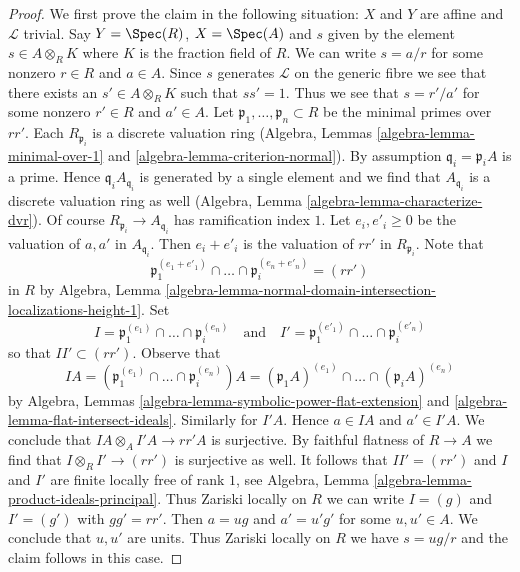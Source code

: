\begin{proof}
\medskip\noindent
We first prove the claim in the following situation:
$X$ and $Y$ are affine and $\mathcal{L}$ trivial. Say $Y = \Spec(R)$,
$X = \Spec(A)$ and $s$ given by the element $s \in A \otimes_R K$
where $K$ is the fraction field of $R$. We can write $s = a/r$
for some nonzero $r \in R$ and $a \in A$. Since $s$ generates $\mathcal{L}$
on the generic fibre we see that there exists an $s' \in A \otimes_R K$
such that $ss' = 1$. Thus we see that $s = r'/a'$ for some
nonzero $r' \in R$ and $a' \in A$. Let
$\mathfrak p_1, \ldots, \mathfrak p_n \subset R$
be the minimal primes over $rr'$. Each $R_{\mathfrak p_i}$
is a discrete valuation ring
(Algebra, Lemmas \ref{algebra-lemma-minimal-over-1} and
\ref{algebra-lemma-criterion-normal}). By assumption
$\mathfrak q_i = \mathfrak p_i A$ is a prime. Hence
$\mathfrak q_i A_{\mathfrak q_i}$ is generated by a single element
and we find that $A_{\mathfrak q_i}$ is a discrete valuation ring as
well (Algebra, Lemma \ref{algebra-lemma-characterize-dvr}). Of course
$R_{\mathfrak p_i} \to A_{\mathfrak q_i}$ has ramification index $1$.
Let $e_i, e'_i \geq 0$ be the  valuation of $a, a'$ in $A_{\mathfrak q_i}$.
Then $e_i + e'_i$ is the valuation of $rr'$ in $R_{\mathfrak p_i}$. Note that
$$
\mathfrak p_1^{(e_1 + e'_1)} \cap \ldots \cap \mathfrak p_i^{(e_n + e'_n)} =
(rr')
$$
in $R$ by Algebra, Lemma
\ref{algebra-lemma-normal-domain-intersection-localizations-height-1}.
Set
$$
I = \mathfrak p_1^{(e_1)} \cap \ldots \cap \mathfrak p_i^{(e_n)}
\quad\text{and}\quad
I' = \mathfrak p_1^{(e'_1)} \cap \ldots \cap \mathfrak p_i^{(e'_n)}
$$
so that $II' \subset (rr')$. Observe that
$$
IA =
(\mathfrak p_1^{(e_1)} \cap \ldots \cap \mathfrak p_i^{(e_n)})A =
(\mathfrak p_1A)^{(e_1)} \cap \ldots \cap (\mathfrak p_i A)^{(e_n)}
$$
by Algebra, Lemmas \ref{algebra-lemma-symbolic-power-flat-extension} and
\ref{algebra-lemma-flat-intersect-ideals}. Similarly for $I'A$. Hence
$a \in IA$ and $a' \in I'A$.
We conclude that $IA \otimes_A I'A \to rr'A$ is surjective.
By faithful flatness of $R \to A$ we find that
$I \otimes_R I' \to (rr')$ is surjective as well.
It follows that $II' = (rr')$ and $I$ and $I'$ are finite locally
free of rank $1$, see
Algebra, Lemma \ref{algebra-lemma-product-ideals-principal}.
Thus Zariski locally on $R$ we can write $I = (g)$ and $I' = (g')$
with $gg' = rr'$. Then $a = ug$ and $a' = u'g'$ for some $u, u' \in A$.
We conclude that $u, u'$ are units. Thus Zariski locally on $R$
we have $s = ug/r$ and the claim follows in this case.


\end{proof}
